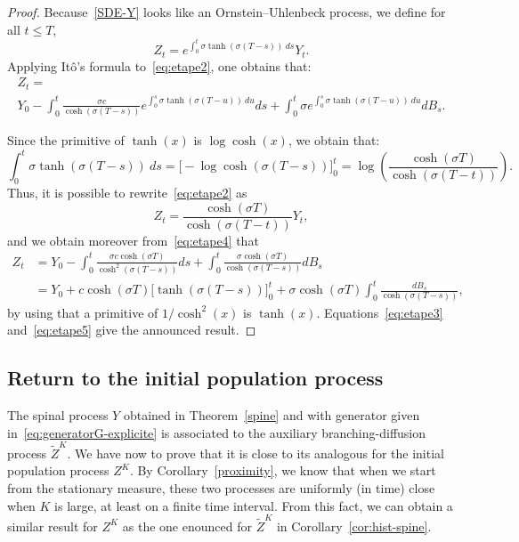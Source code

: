 \documentclass[10pt]{amsart}
\theoremstyle{definition}\newtheorem{defi}[theo]{Definition}\newtheorem{rema}[theo]{Remark}\newtheorem{exam}[theo]{Example}\newtheorem{exem}[theo]{Example}\newtheorem{nota}[theo]{Notation}
\begin{document}
\begin{proof}
Because~\eqref{SDE-Y} looks like an Ornstein--Uhlenbeck process, we define for all $t\le T$,
\begin{equation}\label{eq:etape2}
Z_{t}=e^{\int_{0}^{t}\sigma \tanh\left(\sigma(T-s)\right)\ ds}Y_{t}.
\end{equation}
Applying It\^o's formula to~\eqref{eq:etape2}, one obtains that:
\begin{multline}\label{eq:etape4}
{Z}_{t}= \\
{Y}_{0} -\int_{0}^{t} \frac{\sigma c}{\cosh\left(\sigma(T-s)\right)} e^{\int_{0}^{s}\sigma \tanh\left(\sigma(T-u)\right)\ du} ds+\int_{0}^{t}\sigma e^{\int_{0}^{s}\sigma \tanh\left(\sigma(T-u)\right)\ du} d B_{s}.
\end{multline}

Since the primitive of $\tanh(x)$ is $\log \cosh (x)$, we obtain that:
\begin{equation}\label{eq:etape1}
\int_{0}^{t}\sigma \tanh(\sigma(T-s))\ ds = \big[-\log \cosh(\sigma(T-s))\big]_0^t = \log \left(\frac{\cosh (\sigma T)}{\cosh (\sigma(T-t))}\right).
\end{equation}
Thus, it is possible to rewrite~\eqref{eq:etape2} as
\begin{equation}\label{eq:etape3}
{Z}_{t} = \frac{\cosh (\sigma T)}{\cosh (\sigma(T-t))} {Y}_t,
\end{equation}
and we obtain moreover from~\eqref{eq:etape4} that
\begin{equation}\label{eq:etape5}
\begin{split}
{Z}_{t} &= {Y}_0 - \int_0^t \frac{\sigma c \cosh(\sigma T)}{\cosh^2(\sigma(T-s))}ds +\int_{0}^{t}\frac{\sigma \cosh(\sigma T)}{\cosh(\sigma(T-s))} dB_{s}\\
&= {Y}_0 + c \cosh(\sigma T) \big[\tanh(\sigma(T-s))\big]_0^t + \sigma \cosh(\sigma T)\int_{0}^{t}\frac{dB_s}{\cosh(\sigma(T-s))}, 
\end{split}
\end{equation}
by using that a primitive of $1/\cosh^2(x)$ is $\tanh(x)$. Equations~\eqref{eq:etape3} and~\eqref{eq:etape5} give the announced result.
\end{proof}



\subsection{Return to the initial population process}

The spinal process $Y$ obtained in Theorem~\ref{spine} and with generator given in~\eqref{eq:generatorG-explicite} is associated to the auxiliary branching-diffusion process $\widetilde Z^K$. We have now to prove that it is close to its analogous for the initial population process $Z^K$. By Corollary~\ref{proximity}, we know that when we start from the stationary measure, these two processes are uniformly (in time) close when $K$ is large, at least on a finite time interval. From this fact, we can obtain a similar result for $Z^K$ as the one enounced for $\widetilde{Z}^K$ in Corollary~\ref{cor:hist-spine}.
\end{document}
